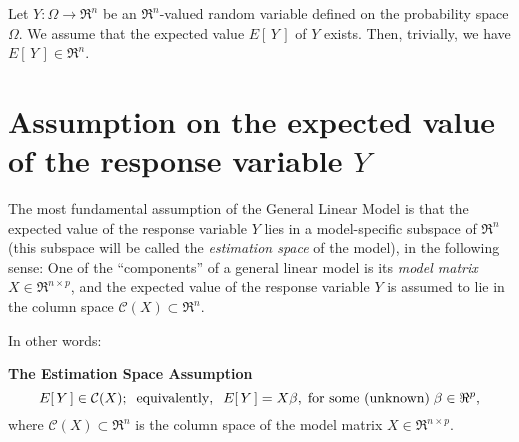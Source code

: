 \documentclass{article}
\begin{document}
\newcommand{\rank}{\textnormal{rank}}



\pagestyle{fancy}

%

\lfoot[]{}
\cfoot[]{}
\rfoot[]{\thepage}


\noindent
Let $Y : \Omega \longrightarrow \Re^{n}$ be an $\Re^{n}$-valued random variable defined on the probability space $\Omega$.  We assume that the expected value $E[\,Y\,]$ of $Y$ exists.  Then, trivially, we have $E[\,Y\,] \in \Re^{n}$.  

\section{Assumption on the expected value of the response variable $Y$}
\setcounter{theorem}{0}\setcounter{equation}{0}

The most fundamental assumption of the General Linear Model is that the expected value of the response variable $Y$ lies in a model-specific subspace of $\Re^{n}$ (this subspace will be called the \emph{estimation space} of the model), in the following sense:  One of the ``components'' of a general linear model is its \emph{model matrix} $X \in \Re^{n \times p}$, and the expected value of the response variable $Y$ is assumed to lie in the column space $\mathcal{C}(X) \subset \Re^{n}$.

\vskip 0.3cm
\noindent In other words:\vskip 0.1cm
\begin{center}
\begin{minipage}{16cm}
\noindent
\textbf{The Estimation Space Assumption}
\begin{equation}\label{StandardMultivariateLinearModel}
E[\,Y\,] \in \mathcal{C}(X);\;\;\textnormal{equivalently},\;\; E[\,Y\,] = X\beta,\; \textnormal{for some (unknown)}\; \beta \in \Re^{p},
\end{equation}
where $\mathcal{C}(X) \subset \Re^{n}$ is the column space of the model matrix $X \in \Re^{n \times p}$.
\end{minipage}
\end{center}
\end{document}
